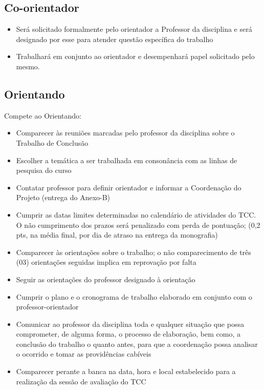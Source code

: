 \subsection{Co-orientador}

	\begin{itemize}	
		\item Ser\'{a} solicitado formalmente pelo orientador a Professor da disciplina e ser\'{a} designado por esse para atender quest\~{a}o espec\'{i}fica do trabalho
		
		\item Trabalhar\'{a} em conjunto ao orientador e desempenhar\'{a} papel solicitado pelo mesmo.
	\end{itemize}


\subsection{Orientando}

Compete ao Orientando:

	\begin{itemize}
		\item Comparecer \`{a}s reuni\~{o}es marcadas pelo professor da disciplina sobre o Trabalho de Conclus\~{a}o
		
		\item Escolher a tem\'{a}tica a ser trabalhada em conson\^{a}ncia com as linhas de pesquisa do curso
		
		\item Contatar professor para definir orientador e informar a Coordena\c{c}\~{a}o do Projeto (entrega do Anexo-B)
		
		\item Cumprir as datas limites determinadas no calend\'{a}rio de atividades do TCC. O n\~{a}o cumprimento dos prazos ser\'{a} penalizado com perda de pontua\c{c}\~{a}o; 
		(0,2 pts, na m\'{e}dia final, por dia de atraso na entrega da monografia)
		
		\item Comparecer \`{a}s orienta\c{c}\~{o}es sobre o trabalho; o n\~{a}o comparecimento de tr\^{e}s (03) orienta\c{c}\~{o}es seguidas implica em reprova\c{c}\~{a}o por falta
		
		\item Seguir as orienta\c{c}\~{o}es do professor designado \`{a} orienta\c{c}\~{a}o
		
		\item Cumprir o plano e o cronograma de trabalho elaborado em conjunto com o professor-orientador
		
		\item Comunicar ao professor da disciplina toda e qualquer situa\c{c}\~{a}o que possa comprometer, de alguma forma, o processo de elabora\c{c}\~{a}o, bem como, a conclus\~{a}o do 			trabalho o quanto antes, para que a coordena\c{c}\~{a}o possa analisar o ocorrido e tomar as provid\^{e}ncias cab\'{i}veis
		
		\item Comparecer perante a banca na data, hora e local estabelecido para a realiza\c{c}\~{a}o da sess\~{a}o de avalia\c{c}\~{a}o do TCC
	\end{itemize}


